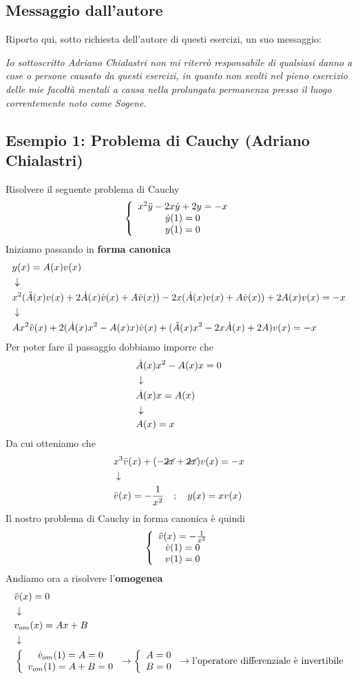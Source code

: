 \subsection{Messaggio dall'autore}

Riporto qui, sotto richiesta dell'autore di questi esercizi, un suo messaggio:

\textit{Io sottoscritto Adriano Chialastri non mi riterrò responsabile di qualsiasi danno a cose o persone causato da questi esercizi, in quanto non svolti nel pieno esercizio delle mie facoltà mentali a causa nella prolungata permanenza presso il luogo correntemente noto come Sogene.
}

\subsection{Esempio 1: Problema di Cauchy (Adriano Chialastri) \label{canon}}
Risolvere il seguente problema di Cauchy
\begin{align}
	\left\{ \begin{array}{ccc} x^2 \ddot{y} - 2x \dot{y} + 2y = -x\\ \dot{y}(1)=0\\ y(1)=0 \end{array} \right.
\end{align}
Iniziamo passando in \textbf{forma canonica}
\begin{align}
	&y(x) = A(x)v(x)	\\ &\downarrow \nonumber \\
	&x^2 (\ddot{A}(x)v(x) + 2\dot{A}(x)\dot{v}(x) + A \ddot{v}(x)) - 2x (\dot{A}(x)v(x) + A \dot{v}(x)) + 2A(x)v(x) = -x \nonumber \\ &\downarrow \nonumber \\
	&Ax^2 \ddot{v}(x) + 2(\dot{A}(x) x^2 - A(x)x) \dot{v}(x) + (\ddot{A}(x) x^2 - 2x\dot{A}(x) +2A)v(x) = -x	
\end{align}
Per poter fare il passaggio dobbiamo imporre che
\begin{align}
	&\dot{A}(x) x^2 - A(x)x = 0 \\ &\downarrow \nonumber \\
	&\dot{A}(x) x = A(x) \nonumber \\ &\downarrow \nonumber \\
	&A(x) = x  
\end{align}
Da cui otteniamo che
\begin{align}
	&x^3 \ddot{v}(x) + (-\cancel{2x} +\cancel{2x})v(x) = -x	\\ &\downarrow \nonumber \\
	&\ddot{v}(x) = -\frac{1}{x^2} \quad ; \quad y(x) = x v(x)
\end{align}
Il nostro problema di Cauchy in forma canonica è quindi
\begin{align}
	\left\{ \begin{array}{ccc} \ddot{v}(x) = -\frac{1}{x^2}\\ \dot{v}(1)=0\\ v(1)=0 \end{array} \right.
\end{align}
Andiamo ora a risolvere l'\textbf{omogenea}
\begin{align}
	&\ddot{v}(x) = 0 \\ &\downarrow \nonumber \\
	&v_{om}(x) = Ax + B  \label{kekwdiff1}\\ &\downarrow \nonumber \\
	&\left\{ \begin{array}{cc} \dot{v}_{om}(1)=A=0\\ v_{om}(1)=A+B=0 \end{array} \right. \to \left\{ \begin{array}{cc} A=0\\ B=0 \end{array} \right. \to \text{l'operatore differenziale è invertibile} 
\end{align}
